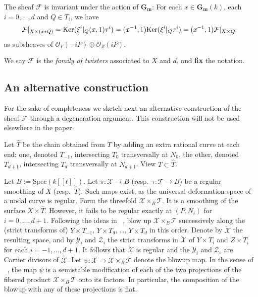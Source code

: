 \documentclass[a4paper,11pt]{amsart}
\theoremstyle{plain}
\theoremstyle{definition}
\theoremstyle{remark}
\def\cc{{\mathbf G}_{\mathbf m}}
\def\O{\mathcal{O}}
\def\Ker{{\rm Ker}}
\def\F{\mathcal{F}}
\begin{document}
The sheaf $\F$ is invariant under the action of $\cc$: For each $x\in\cc(k)$, each $i=0,\dots,d$ and $Q\in T_i$, we have
\begin{equation}\label{QcQ}
\F|_{X\times(x\ast Q)}=\Ker(\xi^i|_Q(x,1)\tau^i)=(x^{-1},1)\Ker(\xi^i|_Q\tau^i)=(x^{-1},1)\F|_{X\times Q}
\end{equation}
as subsheaves of $\O_Y(-iP)\oplus\O_Z(iP)$.

We say $\mathcal F$ is the \emph{family of twisters} associated to $X$ and $d$, and \textbf{fix} the notation.

\subsection{An alternative construction}

For the sake of completeness we sketch next an alternative construction of the sheaf $\F$ through a degeneration argument. This construction will not be used elsewhere in the paper.

Let $\widehat T$ be the chain obtained from $T$ by
adding an extra rational curve at each end: one,
denoted $T_{-1}$, intersecting $T_0$ transversally
at $N_0$, the other, denoted $T_{d+1}$, intersecting
$T_d$ transversally at $N_{d+1}$. View $T\subset\widehat T$.

Let $B:=\text{Spec}(k[[t]])$. Let $\pi\colon\mathcal{X}\rightarrow B$ (resp.~$\tau:\mathcal{T}\rightarrow B$) be a regular smoothing of $X$ (resp.~$\widehat T$). Such maps exist, as the universal deformation space of a nodal curve is regular. Form the threefold
$\mathcal{X}\times_B\mathcal{T}$. It is a
smoothing of the surface $X\times\widehat T$. However,
it fails to be regular exactly at $(P,N_i)$
for $i=0,\dots, d+1$. Following the ideas in ~\cite[\S~4.2]{CEP}, 
blow up $\mathcal{X}\times_B\mathcal{T}$ successively
along the (strict transforms of)
$Y\times T_{-1}$, $Y\times T_0$, \dots, $Y\times T_d$ in this order.
Denote by $\widetilde{\mathcal X}$ the resulting space,
and by $\mathcal Y_i$ and $\mathcal{Z}_i$ the strict transforms in
$\widetilde{\mathcal X}$ of $Y\times T_i$ and $Z\times T_i$ for each
$i=-1,\dots,d+1$. It follows that $\widetilde{\mathcal X}$
is regular and the $\mathcal Y_i$ and $\mathcal Z_i$ are Cartier divisors of
$\widetilde{\mathcal X}$. Let
$\psi\colon\widetilde{\mathcal X}\to\mathcal{X}\times_B\mathcal{T}$
denote the blowup map. In the sense of ~\cite[Lem.~5.3, p.~2953]{CEP},
the map $\psi$ is a semistable modification of 
each of the two projections of the fibered product
$\mathcal{X}\times_B\mathcal{T}$ onto its factors. In particular, 
the composition of the blowup with any of 
these projections is flat.
\end{document}
